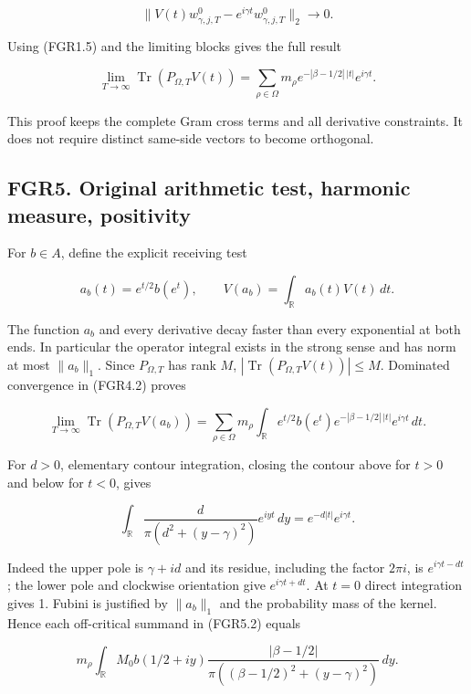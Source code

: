 \[
 \|V(t)w^0_{\gamma,j,T}-e^{i\gamma t}w^0_{\gamma,j,T}\|_2\longrightarrow0.
\]

Using (FGR1.5) and the limiting blocks gives the full result

\[
 \boxed{\lim_{T\to\infty}\operatorname{Tr}(P_{\Omega,T}V(t))
 =\sum_{\rho\in\Omega}m_\rho
 e^{-|\beta-1/2|\,|t|}e^{i\gamma t}.}
\tag{FGR4.2}
\]

This proof keeps the complete Gram cross terms and all derivative
constraints. It does not require distinct same-side vectors to become
orthogonal.

\subsection{FGR5. Original arithmetic test, harmonic measure,
positivity}\label{fgr5.-original-arithmetic-test-harmonic-measure-positivity}

For \(b\in A\), define the explicit receiving test

\[
 a_b(t)=e^{t/2}b(e^t),\qquad
 V(a_b)=\int_{\mathbb R}a_b(t)V(t)\,dt.
\tag{FGR5.1}
\]

The function \(a_b\) and every derivative decay faster than every
exponential at both ends. In particular the operator integral exists in
the strong sense and has norm at most \(\|a_b\|_1\). Since
\(P_{\Omega,T}\) has rank \(M\),
\(|\operatorname{Tr}(P_{\Omega,T}V(t))|\leq M\). Dominated convergence
in (FGR4.2) proves

\[
 \lim_{T\to\infty}\operatorname{Tr}(P_{\Omega,T}V(a_b))
 =\sum_{\rho\in\Omega}m_\rho
   \int_{\mathbb R}e^{t/2}b(e^t)
              e^{-|\beta-1/2|\,|t|}e^{i\gamma t}\,dt.
\tag{FGR5.2}
\]

For \(d>0\), elementary contour integration, closing the contour above
for \(t>0\) and below for \(t<0\), gives

\[
 \int_{\mathbb R}\frac{d}{\pi(d^2+(y-\gamma)^2)}e^{iyt}\,dy
 =e^{-d|t|}e^{i\gamma t}.
\tag{FGR5.3}
\]

Indeed the upper pole is \(\gamma+id\) and its residue, including the
factor \(2\pi i\), is \(e^{i\gamma t-dt}\); the lower pole and clockwise
orientation give \(e^{i\gamma t+dt}\). At \(t=0\) direct integration
gives 1. Fubini is justified by \(\|a_b\|_1\) and the probability mass
of the kernel. Hence each off-critical summand in (FGR5.2) equals

\[
 m_\rho\int_{\mathbb R} M_0b(1/2+iy)
       \frac{|\beta-1/2|}{\pi((\beta-1/2)^2+(y-\gamma)^2)}\,dy.
\tag{FGR5.4}
\]

